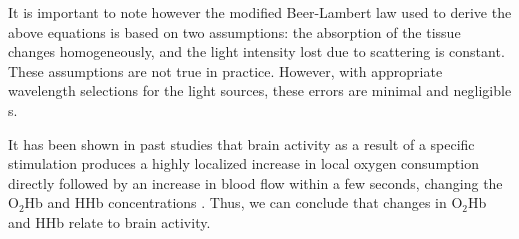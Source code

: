 It is important to note however the modified Beer-Lambert law used to derive the above equations is based on two assumptions: the absorption of the tissue changes homogeneously, and the light intensity lost due to scattering is constant. These assumptions are not true in practice. However, with appropriate wavelength selections for the light sources, these errors are minimal and negligible \cite{eke06}s.

It has been shown in past studies that brain activity as a result of a specific stimulation produces a highly localized increase in local oxygen consumption directly followed by an increase in blood flow within a few seconds, changing the O$_{2}$Hb and HHb concentrations \cite{freeman03}. Thus, we can conclude that changes in O$_{2}$Hb and HHb relate to brain activity.